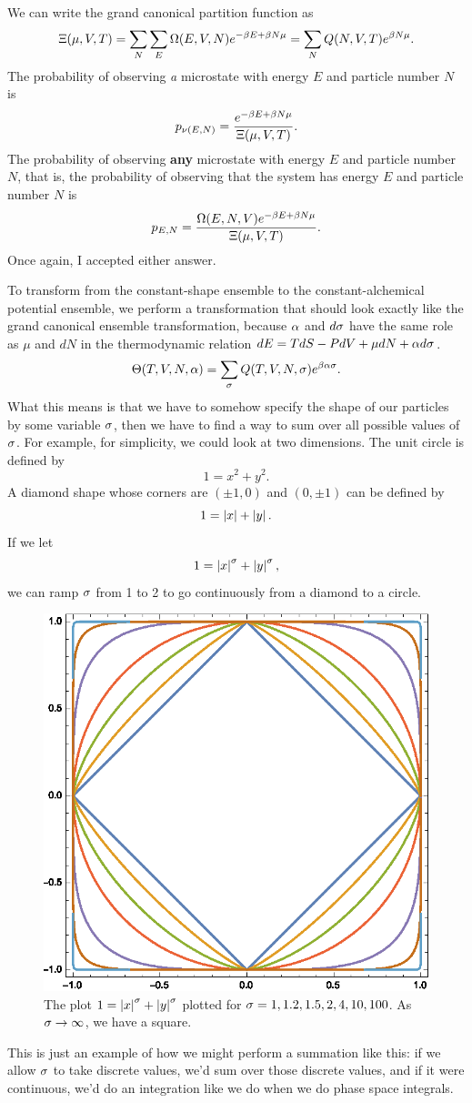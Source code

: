 \documentclass[12pt]{article}
\begin{document}
 We can write the grand canonical partition function as
\[ \Xi(\mu,V,T) = \sum_N\sum_E \Omega(E,V,N) e^{-\beta E + \beta N \mu} = \sum_N Q(N,V,T)e^{\beta N \mu}.\]
The probability of observing \emph{a} microstate with energy $E$ and particle number $N$ is
\[ p_{\nu(E,N)} = \frac{e^{-\beta E +\beta N \mu}}{\Xi(\mu,V,T)}.\]
The probability of observing \textbf{any} microstate with energy $E$ and particle number $N$, that is, the probability of observing that the system has energy $E$ and particle number $N$ is
\[ p_{E,N} = \frac{\Omega(E,N,V)e^{-\beta E + \beta N \mu}}{\Xi(\mu,V,T)}.\]
Once again, I accepted either answer.

 To transform from the constant-shape ensemble to the constant-alchemical potential ensemble, we perform a transformation that should look exactly like the grand canonical ensemble transformation, because $\alpha$ and $d\sigma$ have the same role as $\mu$ and $dN$ in the thermodynamic relation $dE = TdS - PdV + \mu dN + \alpha d\sigma$.
\[ \Theta(T,V,N,\alpha) = \sum_\sigma Q(T,V,N,\sigma) e^{\beta \alpha \sigma}.\]
What this means is that we have to somehow specify the shape of our particles by some variable $\sigma$, then we have to find a way to sum over all possible values of $\sigma$. For example, for simplicity, we could look at two dimensions. The unit circle is defined by
\[ 1 = x^2 + y^2.\]
A diamond shape whose corners are $(\pm1,0)$ and $(0,\pm1)$ can be defined by
\[ 1 = \left | x \right | + \left | y \right |.\]
If we let
\[ 1 = \left | x \right |^\sigma + \left | y \right |^\sigma,\]
we can ramp $\sigma$ from 1 to 2 to go continuously from a diamond to a circle.
\begin{figure}[h]
\centering
\includegraphics[scale=1.0]{shapes.eps}
\caption{The plot $1=\left | x \right |^\sigma + \left | y \right |^\sigma$ plotted for $\sigma = 1,1.2,1.5,2,4,10,100$. As $\sigma\rightarrow \infty$, we have a square.}
\end{figure}
This is just an example of how we might perform a summation like this: if we allow $\sigma$ to take discrete values, we'd sum over those discrete values, and if it were continuous, we'd do an integration like we do when we do phase space integrals.
\end{document}
